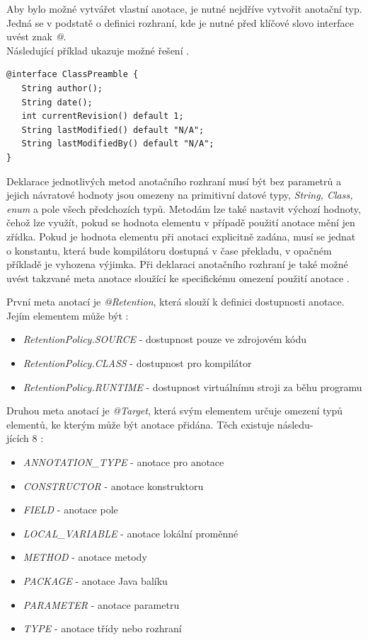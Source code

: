 \documentclass{projekt}
\begin{document}
Aby bylo možné vytvářet vlastní anotace, je nutné nejdříve vytvořit anotační typ. Jedná se 
v podstatě o definici rozhraní, kde je nutné před klíčové slovo interface uvést znak {\it @}.\\ 
Následující příklad ukazuje možné řešení \cite{dvanact}.

\begin{verbatim}
@interface ClassPreamble {
   String author();
   String date();
   int currentRevision() default 1;
   String lastModified() default "N/A";
   String lastModifiedBy() default "N/A";
}
\end{verbatim}

Deklarace jednotlivých metod anotačního rozhraní musí být bez parametrů a jejich návratové hodnoty jsou omezeny na primitivní datové typy, {\it String, Class, enum} a pole všech předchozích typů. Metodám lze také nastavit výchozí hodnoty, čehož lze využít, pokud se hodnota elementu v případě použití anotace mění jen zřídka. Pokud je hodnota elementu při anotaci explicitně zadána, musí se jednat o konstantu, která bude kompilátoru dostupná v čase překladu, v opačném příkladě je vyhozena výjimka. Při deklaraci anotačního rozhraní je také možné uvést takzvané meta anotace sloužící ke specifickému omezení použití anotace \cite{jedenact}.


První meta anotací je {\it @Retention}, která slouží k definici dostupnosti anotace. Jejím elementem může být \cite{trinact}:

\begin{itemize}
\item {\it RetentionPolicy.SOURCE} - dostupnost pouze ve zdrojovém kódu
\item {\it RetentionPolicy.CLASS} - dostupnost pro kompilátor
\item {\it RetentionPolicy.RUNTIME} - dostupnost virtuálnímu stroji za běhu programu
\end{itemize}


Druhou meta anotací je {\it @Target}, která svým elementem určuje omezení typů elementů, ke kterým může být anotace přidána. Těch existuje následu-\\jících 8 \cite{trinact}: 

\begin{itemize}
\item {\it ANNOTATION\_TYPE} - anotace pro anotace
\item {\it CONSTRUCTOR} - anotace konstruktoru
\item {\it FIELD} - anotace pole
\item {\it LOCAL\_VARIABLE} - anotace lokální proměnné
\item {\it METHOD} - anotace metody
\item {\it PACKAGE} - anotace Java balíku
\item {\it PARAMETER} - anotace parametru
\item {\it TYPE} - anotace třídy nebo rozhraní
\end{itemize}
\end{document}
